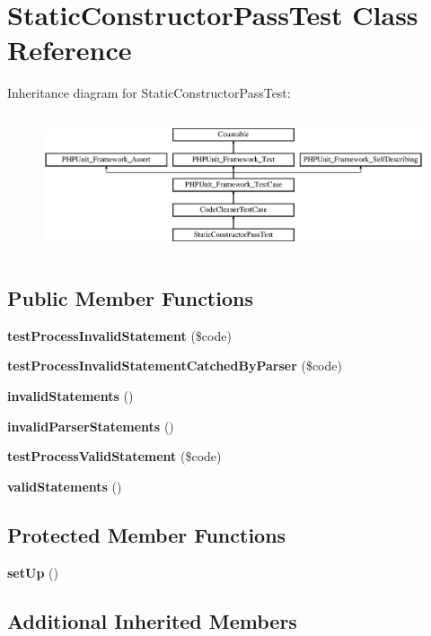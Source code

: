 \section{Static\+Constructor\+Pass\+Test Class Reference}
\label{class_psy_1_1_test_1_1_code_cleaner_1_1_static_constructor_pass_test}
Inheritance diagram for Static\+Constructor\+Pass\+Test\+:\begin{figure}[H]
\begin{center}
\leavevmode
\includegraphics[height=4.129793cm]{class_psy_1_1_test_1_1_code_cleaner_1_1_static_constructor_pass_test}
\end{center}
\end{figure}
\subsection*{Public Member Functions}
\begin{DoxyCompactItemize}
\item 
{\bf test\+Process\+Invalid\+Statement} (\$code)
\item 
{\bf test\+Process\+Invalid\+Statement\+Catched\+By\+Parser} (\$code)
\item 
{\bf invalid\+Statements} ()
\item 
{\bf invalid\+Parser\+Statements} ()
\item 
{\bf test\+Process\+Valid\+Statement} (\$code)
\item 
{\bf valid\+Statements} ()
\end{DoxyCompactItemize}
\subsection*{Protected Member Functions}
\begin{DoxyCompactItemize}
\item 
{\bf set\+Up} ()
\end{DoxyCompactItemize}
\subsection*{Additional Inherited Members}


